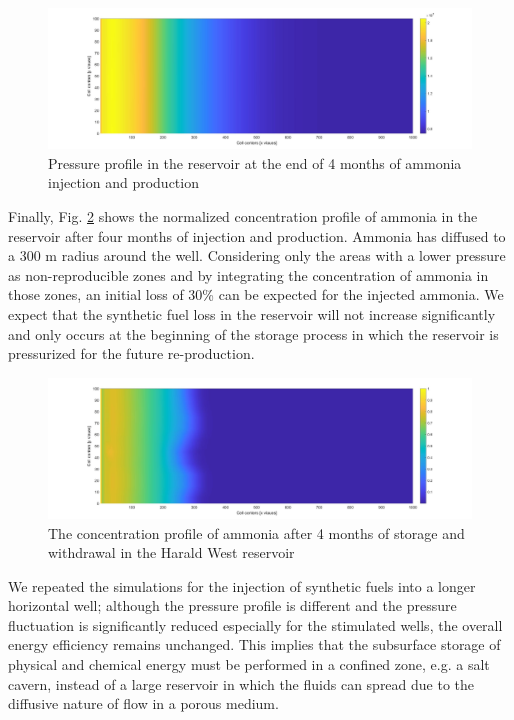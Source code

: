 \documentclass{ECOS_2021}
\begin{document}
\begin{figure}[H]
\centering
\includegraphics[width=14cm]{ammonia_pressure_harald}

\caption{\label{fig:Pressure-profile-NH3}Pressure profile in the reservoir
at the end of 4 months of ammonia injection and production}
\end{figure}

Finally, Fig. \ref{fig:concentration-profile-NH3} shows the normalized
concentration profile of ammonia in the reservoir after four months
of injection and production. Ammonia has diffused to a 300 m radius
around the well. Considering only the areas with a lower pressure
as non-reproducible zones and by integrating the concentration of
ammonia in those zones, an initial loss of 30\% can be expected for
the injected ammonia. We expect that the synthetic fuel loss in the
reservoir will not increase significantly and only occurs at the beginning
of the storage process in which the reservoir is pressurized for the
future re-production. 

\begin{figure}[H]
\centering
\includegraphics[width=14cm]{ammonia_tracer_harald}

\caption{\label{fig:concentration-profile-NH3}The concentration profile of
ammonia after 4 months of storage and withdrawal in the Harald West
reservoir}
\end{figure}

We repeated the simulations for the injection of synthetic fuels into a longer horizontal well; although the pressure
profile is different and the pressure fluctuation is significantly
reduced especially for the stimulated wells, the overall energy efficiency
remains unchanged. This implies that the subsurface storage of physical
and chemical energy must be performed in a confined zone, e.g. a salt
cavern, instead of a large reservoir in which the fluids can spread
due to the diffusive nature of flow in a porous medium.
\end{document}
